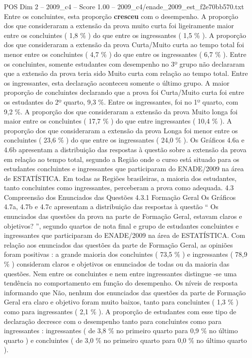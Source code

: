 \begin{textsample}{POS Dim 2 – 2009\_c4 – Score 1.00 – 2009\_c4/enade\_2009\_est\_f2e70bb570.txt}
Entre os concluintes, esta proporção \textbf{cresceu} com o desempenho.
A proporção dos que consideraram a extensão da prova muito curta foi ligeiramente maior entre os concluintes ( 1,8 \% ) do que entre os ingressantes ( 1,5 \% ).
A proporção dos que consideraram a extensão da prova Curta/Muito curta ao tempo total foi menor entre os concluintes ( 4,7 \% ) do que entre os ingressantes ( 6,7 \% ).
Entre os concluintes, somente estudantes com desempenho no 3º grupo não declararam que a extensão da prova teria sido Muito curta com relação ao tempo total.
Entre os ingressantes, esta declaração aconteceu somente o último grupo.
A maior proporção de concluintes declarando que a prova foi Curta/Muito curta foi entre os estudantes do 2º quarto, 9,3 \%.
Entre os ingressantes, foi no 1º quarto, com 9,2 \%.
A proporção dos que consideraram a extensão da prova Muito longa foi maior entre os concluintes ( 17,7 \% ) do que entre ingressantes ( 10,4 \% ).
A proporção dos que consideraram a extensão da prova Longa foi menor entre os concluintes ( 23,6 \% ) do que entre os ingressantes ( 24,0 \% ).
Os Gráficos 4.6a e 4.6b apresentam a distribuição das respostas à questão sobre a extensão da prova em relação ao tempo total, segundo a Região onde o curso está situado para os estudantes concluintes e ingressantes que participaram do ENADE/2009 na área de ESTATÍSTICA.
Em todas as Regiões brasileiras, a maioria dos estudantes, tanto concluintes como ingressantes, perceberam a prova como adequada. 4.3 Compreensão dos Enunciados das Questões 4.3.1 Formação Geral Os Gráficos 4.7a, 4.7b e 4.7c apresentam a distribuição das respostas à questão “ Os enunciados das questões da prova na parte de Formação Geral, estavam claros e objetivos? ”, segundo quartos de nota final e grupo de estudantes concluintes e ingressantes que participaram do ENADE/2009 na área de ESTATÍSTICA.
Com relação aos enunciados das questões da parte de Formação Geral, as opiniões foram positivas : a grande maioria dos concluintes ( 73,5 \% ) e ingressantes ( 78,9 \% ) consideram claros e objetivos os enunciados de todas ou da maioria das questões.
Nem entre os concluintes e nem entre ingressantes distingue -se uma tendência no comportamento em função do desempenho.
Os níveis de resposta informando que Não, nenhum dos enunciados das questões da parte de Formação Geral era claro e objetivo foram muito baixos, tanto para concluintes ( 1,3 \% ) como para ingressantes ( 2,1 \% ).
A proporção de estudantes com esse tipo de declaração decresce com o desempenho tanto para concluintes como para ingressantes : ingressantes ( de 3,8 \% no primeiro quarto para 0,9 \% no último quarto ) e concluintes ( de 3,0 \% no primeiro quarto para 0,0 \% no último quarto ).

\end{textsample}
